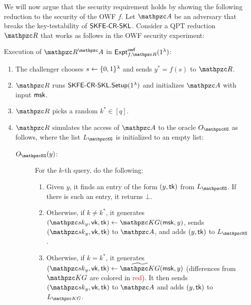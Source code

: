 We will now argue that the security requirement holds by showing the
following reduction to the security of the OWF $f$. Let $\qA$ be an
adversary that breaks the key-testability of $\mathsf{SKFE}\textrm{-}\mathsf{CR}\textrm{-}\mathsf{SKL}$. Consider
a QPT reduction $\qR$ that works as follows in the OWF security
experiment:

\begin{description}
\item Execution of $\qR^\qA$ in
$\expa{f,\qR}{owf}(1^\secp)$:

\begin{enumerate}
\item The challenger chooses $s \leftarrow \{0,1\}^\lambda$ and sends
$y^* = f(s)$ to $\qR$.

\item $\qR$ runs $\mathsf{SKFE}\textrm{-}\mathsf{CR}\textrm{-}\mathsf{SKL}.\mathsf{Setup}(1^\lambda)$ and initializes $\qA$
with input $\mathsf{msk}$.

\item $\qR$ picks a random $k^* \in [q]$.

\item $\qR$ simulates the access of $\qA$ to the oracle
$\Oracle{\qKG}$ as follows, where the list $\List{\qKG}$ is
initialized to an empty list:

\begin{description}
\item[$\Oracle{\qKG}(y)$:] For the $k$-th query, do the following:
\begin{enumerate}
\item 
Given $y$, it finds an entry of the form
$(y,\mathsf{tk})$ from $\List{\qKG}$. If there is such an entry, it
returns $\bot$.

\item
Otherwise, if $k \neq k^*$, it generates
$(\qsk_y,\vk,\tk)\la\qKG(\msk,y)$, sends $(\qsk_y,\vk,\tk)$ to $\qA$,
and adds $(y,\mathsf{tk})$ to $\List{\qKG}$.

\item Otherwise, if $k = k^*$, it generates $(\qsk_y, \vk, \tk) \gets
\widetilde{\qKG}(\msk, y)$ (differences from $\qKG$ are colored in
\textcolor{red}{red}). It then sends $(\qsk_y, \vk, \tk)$ to $\qA$ and
adds $(y, \mathsf{tk})$ to $L_{\qKG}$.
\end{enumerate}
\end{description}

\end{enumerate}
\end{description}
